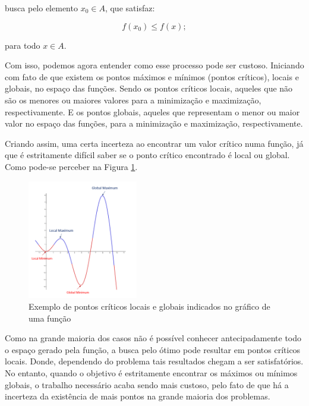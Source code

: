                 busca pelo elemento \(x_0 \in A\), que satisfaz:

                    \begin{equation}
                        f(x_0) \leq f(x);
                    \end{equation}

                para todo \(x \in A\).

\vspace{\baselineskip}
Com isso, podemos agora entender como esse processo pode ser custoso. Iniciando
com fato de que existem os pontos máximos e mínimos (pontos críticos), locais
e globais, no espaço das funções. Sendo os pontos críticos locais, aqueles que
não são os menores ou maiores valores para a minimização e maximização,
respectivamente. E os pontos globais, aqueles que representam o menor ou maior
valor no espaço das funções, para a minimização e maximização, respectivamente.

Criando assim, uma certa incerteza ao encontrar um valor crítico numa função,
já que é estritamente difícil saber se o ponto crítico encontrado é local ou
global. Como pode-se perceber na Figura
\ref{grafico_local_global_pontosCriticos}.


\begin{figure}[h]
    \includegraphics[width=0.43\textwidth]
        {src/grafico_local_global_pontosCriticos.png}
    \centering
    \caption{Exemplo de pontos críticos locais e globais indicados no gráfico
        de uma função}
    \label{grafico_local_global_pontosCriticos}
\end{figure}

Como na grande maioria dos casos não é possível conhecer antecipadamente todo
o espaço gerado pela função, a busca pelo ótimo pode resultar em pontos
críticos locais. Donde, dependendo do problema tais resultados chegam a ser
satisfatórios. No entanto, quando o objetivo é estritamente encontrar os máximos
ou mínimos globais, o trabalho necessário acaba sendo mais custoso, pelo fato de
que há a incerteza da existência de mais pontos na grande maioria dos problemas.

